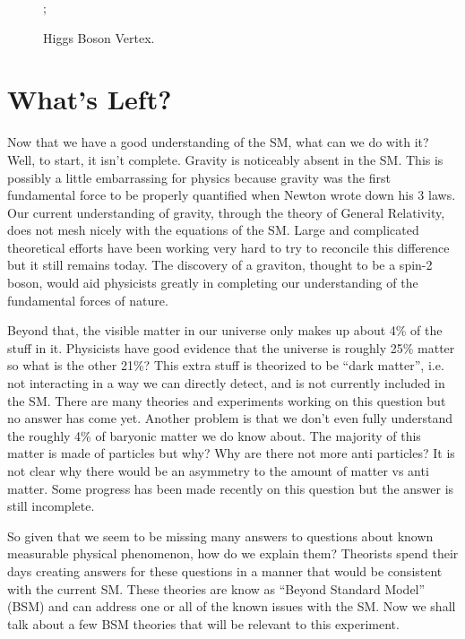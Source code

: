 \begin{figure} %
   \centering
      ;
   \caption{Higgs Boson Vertex.}
   \label{fig:fig_1-9}
\end{figure}
\clearpage
\section{What's Left?}

Now that we have a good understanding of the SM, what can we do with it? Well, to start, it isn't complete. 
Gravity is noticeably absent in the SM. This is possibly a little embarrassing for physics because gravity was the first fundamental force to be properly quantified when Newton wrote down his 3 laws.
Our current understanding of gravity, through the theory of General Relativity, does not mesh nicely with the equations of the SM. Large and complicated theoretical efforts have been working very hard to try to reconcile this difference but it still remains today. 
The discovery of a graviton, thought to be a spin-2 boson, would aid physicists greatly in completing our understanding of the fundamental forces of nature.

Beyond that, the visible matter in our universe only makes up about 4\% of the stuff in it. Physicists have good evidence that the universe is roughly 25\% matter so what is the other 21\%?
This extra stuff is theorized to be ``dark matter'', i.e. not interacting in a way we can directly detect, and is not currently included in the SM. There are many theories and experiments working on this question but no answer has come yet. Another problem is that we don't even fully understand the roughly 4\% of baryonic matter we do know about. The majority of this matter is made of particles but why? Why are there not more anti particles? It is not clear why there would be an asymmetry to the amount of matter vs anti matter. 
Some progress has been made recently on this question but the answer is still incomplete.

So given that we seem to be missing many answers to questions about known measurable physical phenomenon, how do we explain them? Theorists spend their days creating answers for these questions in a manner that would be consistent with the current SM.
These theories are know as ``Beyond Standard Model'' (BSM) and can address one or all of the known issues with the SM. Now we shall talk about a few BSM theories that will be relevant to this experiment.